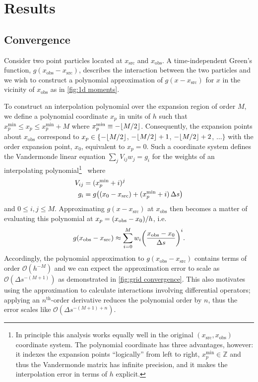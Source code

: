 \section{Results}

\subsection{Convergence}

Consider two point particles located at $x_\text{src}$ and $x_\text{obs}$.
A time-independent Green's function, $g(x_\text{obs} - x_\text{src})$, describes the interaction between the two particles and we wish to construct a polynomial approximation of $g(x - x_\text{src})$ for $x$ in the vicinity of $x_\text{obs}$ as in \cref{fig:1d moments}.

To construct an interpolation polynomial over the expansion region of order $M$, we define a polynomial coordinate $x_p$ in units of $h$ such that $x_p^\text{min} \leqslant x_p \leqslant x_p^\text{min} + M$ where $x_p^\text{min} \equiv -\floor*{M/2}$.
Consequently, the expansion points about $x_\text{obs}$ correspond to $x_p \in \{-\floor*{M/2}$, $-\floor*{M/2} + 1$, $-\floor*{M/2} + 2$, $\ldots\}$ with the  order expansion point, $x_0$, equivalent to $x_p = 0$.
Such a coordinate system defines the Vandermonde linear equation $\sum_{j}V_{ij} w_j = g_i$ for the weights of an interpolating polynomial\footnote{In principle this analysis works equally well in the original $(x_\text{src}, x_\text{obs})$ coordinate system. The polynomial coordinate has three advantages, however: it indexes the expansion points ``logically'' from left to right, $x_p^\text{min} \in \mathbb{Z}$ and thus the Vandermonde matrix has infinite precision, and it makes the interpolation error in terms of $h$ explicit.}~\cite{NumericalRecipes} where
\begin{subequations}
  \begin{align}
    V_{ij} &= (x_p^\text{min} + i)^j \\
    g_i &= g\qty((x_0 - x_\text{src}) + (x_p^\text{min} + i)\, \Delta s)
  \end{align}
\end{subequations}
and $0 \leqslant i, j \leqslant M$.
Approximating $g(x - x_\text{src})$ at $x_\text{obs}$ then becomes a matter of evaluating this polynomial at $x_p = \qty(x_\text{obs} - x_0)/h$, i.e.
\begin{equation}
  g(x_\text{obs} - x_\text{src}) \approx \sum_{i = 0}^{M} w_i \qty(\frac{x_\text{obs} - x_0}{\Delta s})^i.
\end{equation}
Accordingly, the polynomial approximation to $g(x_\text{obs} - x_\text{src})$ contains terms of order $\mathcal{O}(h^{-M})$ and we can expect the approximation error to scale as $\mathcal{O}(\Delta s^{-(M + 1)})$ as demonstrated in \cref{fig:grid convergence}.
This also motivates using the approximation to calculate interactions involving differential operators; applying an $n^\text{th}$-order derivative reduces the polynomial order by $n$, thus the error scales like $\mathcal{O}(\Delta s^{-(M + 1) + n})$.

